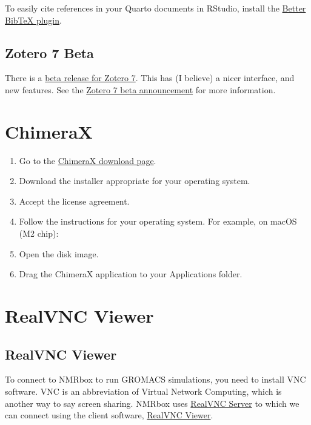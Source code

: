 \documentclass[
  letterpaper,
  DIV=11,
  numbers=noendperiod]{scrreprt}
\providecommand{\tightlist}{%
  \setlength{\itemsep}{0pt}\setlength{\parskip}{0pt}}\usepackage{longtable,booktabs,array}
\begin{document}
To easily cite references in your Quarto documents in RStudio, install
the \href{https://retorque.re/zotero-better-bibtex/}{Better BibTeX
plugin}.

\subsection{Zotero 7 Beta}\label{zotero-7-beta}

There is a \href{https://www.zotero.org/support/beta_builds}{beta
release for Zotero 7}. This has (I believe) a nicer interface, and new
features. See the
\href{https://forums.zotero.org/discussion/105094/announcing-the-zotero-7-beta}{Zotero
7 beta announcement} for more information.

\section{ChimeraX}\label{chimerax}

\begin{enumerate}
\def\labelenumi{\arabic{enumi}.}
\tightlist
\item
  Go to the
  \href{https://www.cgl.ucsf.edu/chimerax/download.html}{ChimeraX
  download page}.
\item
  Download the installer appropriate for your operating system.
\item
  Accept the license agreement.
\item
  Follow the instructions for your operating system. For example, on
  macOS (M2 chip):
\item
  Open the disk image.
\item
  Drag the ChimeraX application to your Applications folder.
\end{enumerate}

\section{RealVNC Viewer}\label{realvnc-viewer}

\subsection{RealVNC Viewer}\label{realvnc-viewer-1}

To connect to NMRbox to run GROMACS simulations, you need to install VNC
software. VNC is an abbreviation of Virtual Network Computing, which is
another way to say screen sharing. NMRbox uses
\href{https://www.realvnc.com/en/connect/download/vnc/}{RealVNC Server}
to which we can connect using the client software,
\href{https://www.realvnc.com/en/connect/download/viewer/}{RealVNC
Viewer}.
\end{document}
